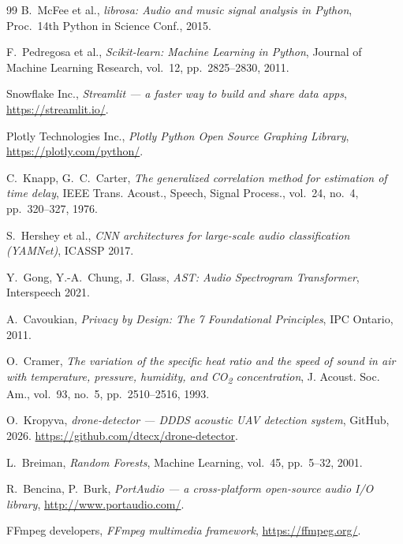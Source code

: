 \documentclass[11pt,a4paper]{article}
\begin{document}
\begin{thebibliography}{99}
B.~McFee et al.,
\textit{librosa: Audio and music signal analysis in Python},
Proc.\ 14th Python in Science Conf., 2015.

F.~Pedregosa et al.,
\textit{Scikit-learn: Machine Learning in Python},
Journal of Machine Learning Research, vol.\ 12, pp.\ 2825--2830, 2011.

Snowflake Inc.,
\textit{Streamlit --- a faster way to build and share data apps},
\url{https://streamlit.io/}.

Plotly Technologies Inc.,
\textit{Plotly Python Open Source Graphing Library},
\url{https://plotly.com/python/}.

C.~Knapp, G.~C.~Carter,
\textit{The generalized correlation method for estimation of time delay},
IEEE Trans. Acoust., Speech, Signal Process., vol.\ 24, no.\ 4,
pp.\ 320--327, 1976.

S.~Hershey et al.,
\textit{CNN architectures for large-scale audio classification (YAMNet)},
ICASSP 2017.

Y.~Gong, Y.-A.~Chung, J.~Glass,
\textit{AST: Audio Spectrogram Transformer},
Interspeech 2021.

A.~Cavoukian,
\textit{Privacy by Design: The 7 Foundational Principles},
IPC Ontario, 2011.

O.~Cramer,
\textit{The variation of the specific heat ratio and the speed of sound
in air with temperature, pressure, humidity, and CO\textsubscript{2}
concentration},
J. Acoust. Soc. Am., vol.\ 93, no.\ 5, pp.\ 2510--2516, 1993.

O.~Kropyva,
\textit{drone-detector --- DDDS acoustic UAV detection system},
GitHub, 2026.
\url{https://github.com/dtecx/drone-detector}.

L.~Breiman,
\textit{Random Forests},
Machine Learning, vol.\ 45, pp.\ 5--32, 2001.

R.~Bencina, P.~Burk,
\textit{PortAudio --- a cross-platform open-source audio I/O library},
\url{http://www.portaudio.com/}.

FFmpeg developers,
\textit{FFmpeg multimedia framework},
\url{https://ffmpeg.org/}.

\end{thebibliography}
\end{document}
